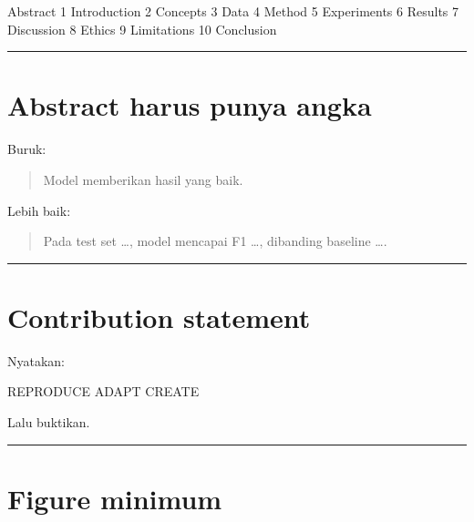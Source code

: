 \documentclass[
  indonesian,
  letterpaper,
  DIV=11,
  numbers=noendperiod]{scrreprt}
\newenvironment{Shaded}{\begin{snugshade}}{\end{snugshade}}
\newcommand{\NormalTok}[1]{\textcolor[rgb]{0.00,0.23,0.31}{#1}}
\begin{document}
\begin{Shaded}
\begin{Highlighting}[]
\NormalTok{Abstract}
\NormalTok{1 Introduction}
\NormalTok{2 Concepts}
\NormalTok{3 Data}
\NormalTok{4 Method}
\NormalTok{5 Experiments}
\NormalTok{6 Results}
\NormalTok{7 Discussion}
\NormalTok{8 Ethics}
\NormalTok{9 Limitations}
\NormalTok{10 Conclusion}
\end{Highlighting}
\end{Shaded}

\begin{center}\rule{0.5\linewidth}{0.5pt}\end{center}

\section{Abstract harus punya angka}\label{abstract-harus-punya-angka}

Buruk:

\begin{quote}
Model memberikan hasil yang baik.
\end{quote}

Lebih baik:

\begin{quote}
Pada test set \ldots, model mencapai F1 \ldots, dibanding baseline
\ldots.
\end{quote}

\begin{center}\rule{0.5\linewidth}{0.5pt}\end{center}

\section{Contribution statement}\label{contribution-statement}

Nyatakan:

\begin{Shaded}
\begin{Highlighting}[]
\NormalTok{REPRODUCE}
\NormalTok{ADAPT}
\NormalTok{CREATE}
\end{Highlighting}
\end{Shaded}

Lalu buktikan.

\begin{center}\rule{0.5\linewidth}{0.5pt}\end{center}

\section{Figure minimum}\label{figure-minimum}
\end{document}
